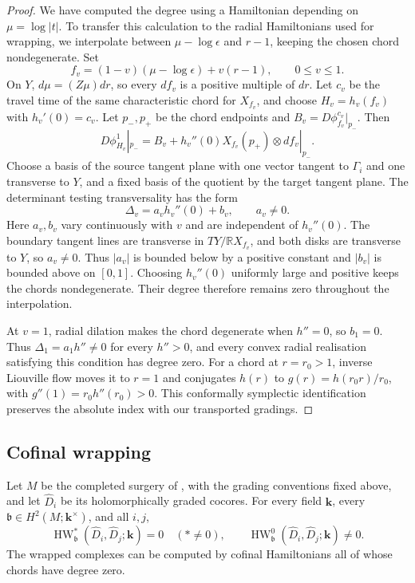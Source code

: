 \documentclass[a4paper]{amsart}
\newcommand{\kk}{\mathbf{k}}
\newcommand{\R}{\mathbb{R}}
\DeclareMathOperator{\HW}{HW}
\numberwithin{equation}{section}
\begin{document}
\begin{proof}
We have computed the degree using a Hamiltonian depending on
$\mu=\log|t|$. To transfer this calculation to the radial Hamiltonians
used for wrapping, we interpolate between $\mu-\log\epsilon$ and
$r-1$, keeping the chosen chord nondegenerate. Set
\[
 f_v=(1-v)(\mu-\log\epsilon)+v(r-1),\qquad 0\le v\le1.
\]
On $Y$, $d\mu=(Z\mu)dr$, so every $df_v$ is a positive multiple
of $dr$. Let $c_v$ be the travel time of the same characteristic
chord for $X_{f_v}$, and choose $H_v=h_v(f_v)$ with
$h_v'(0)=c_v$. Let $p_-,p_+$ be the chord endpoints and
$B_v=D\phi_{f_v}^{c_v}|_{p_-}$. Then
\[
 D\phi_{H_v}^1|_{p_-}
 =B_v+h_v''(0)X_{f_v}(p_+)\otimes df_v|_{p_-}.
\]
Choose a basis of the source tangent plane with one vector tangent
to $\Gamma_i$ and one transverse to $Y$, and a fixed basis of the
quotient by the target tangent plane. The determinant testing
transversality has the form
\[
 \Delta_v=a_vh_v''(0)+b_v,\qquad a_v\ne0.
\]
Here $a_v,b_v$ vary continuously with $v$ and are independent of
$h_v''(0)$. The boundary tangent lines are transverse in
$TY/\R X_{f_v}$, and both disks are transverse to $Y$, so $a_v\ne0$.
Thus $|a_v|$ is bounded below by a positive constant and $|b_v|$
is bounded above on $[0,1]$. Choosing $h_v''(0)$ uniformly large
and positive keeps the chords nondegenerate. Their degree therefore
remains zero throughout the interpolation.

At $v=1$, radial dilation makes the chord degenerate when $h''=0$,
so $b_1=0$. Thus $\Delta_1=a_1h''\ne0$ for every $h''>0$, and every
convex radial realisation satisfying this condition has degree zero.
For a chord at $r=r_0>1$, inverse Liouville flow moves it to $r=1$
and conjugates $h(r)$ to $g(r)=h(r_0r)/r_0$, with
$g''(1)=r_0h''(r_0)>0$. This conformally symplectic identification
preserves the absolute index with our transported gradings.
\end{proof}

\subsection{Cofinal wrapping}

\begin{theorem}\label{thm:degree-zero}
Let $M$ be the completed surgery of ,
with the grading conventions fixed above, and let $\widehat D_i$ be
its holomorphically graded cocores. For every field $\kk$, every
$\mathfrak b\in H^2(M;\kk^\times)$, and all $i,j$,
\[
 \HW^*_{\mathfrak b}(\widehat D_i,\widehat D_j;\kk)=0\quad(*\ne0),
 \qquad
 \HW^0_{\mathfrak b}(\widehat D_i,\widehat D_j;\kk)\ne0.
\]
The wrapped complexes can be computed by cofinal Hamiltonians all
of whose chords have degree zero.
\end{theorem}
\end{document}

